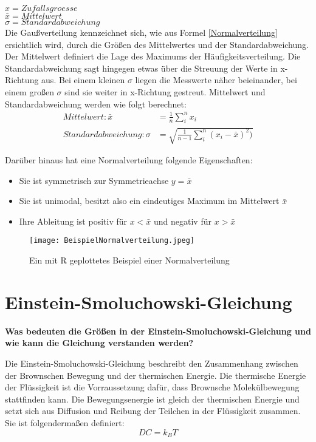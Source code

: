 \documentclass[a4paper, 12pt]{article}
\begin{document}
\noindent $x = Zufallsgroesse$\\
\noindent $\bar{x} = Mittelwert$\\
\noindent $\sigma = Standardabweichung$\\

Die Gaußverteilung kennzeichnet sich, wie aus Formel \ref{Normalverteilung} ersichtlich wird, durch die Größen des Mittelwertes und der Standardabweichung. Der Mittelwert definiert die Lage des Maximums der Häufigkeitsverteilung. Die Standardabweichung sagt hingegen etwas über die Streuung der Werte in x-Richtung aus. Bei einem kleinen $\sigma$ liegen die Messwerte näher beieinander, bei einem großen $\sigma$ sind sie weiter in x-Richtung gestreut.  
Mittelwert und Standardabweichung werden wie folgt berechnet:
\begin{equation}
\begin{split}
Mittelwert: \bar{x} &= \frac{1}{n}\sum\limits_{i}^{n}x_i\\
Standardabweichung: \sigma &= \sqrt{\frac{1}{n-1}\sum\limits_{i}^{n}(x_i-\bar{x})^2)}
\end{split}
\end{equation}

Darüber hinaus hat eine Normalverteilung folgende Eigenschaften:
\begin{itemize}
\item{Sie ist symmetrisch zur Symmetrieachse $y=\bar{x}$}
\item{Sie ist unimodal, besitzt also ein eindeutiges Maximum im Mittelwert $\bar{x}$}
\item{Ihre Ableitung ist positiv für $x<\bar{x}$ und negativ für $x>\bar{x}$}
\end{itemize}

\begin{figure}[h]
\centering
\texttt{[image: BeispielNormalverteilung.jpeg]}
\caption{Ein mit R geplottetes Beispiel einer Normalverteilung}
\end{figure}

\section{Einstein-Smoluchowski-Gleichung}
\textbf{Was bedeuten die Größen in der Einstein-Smoluchowski-Gleichung und wie kann die
Gleichung verstanden werden?}

Die Einstein-Smoluchowski-Gleichung beschreibt den Zusammenhang zwischen der Brownschen Bewegung und der thermischen Energie. Die thermische Energie der Flüssigkeit ist die Vorraussetzung dafür, dass Brownsche Molekülbewegung stattfinden kann. Die Bewegungsenergie ist gleich der thermischen Energie und setzt sich aus Diffusion und Reibung der Teilchen in der Flüssigkeit zusammen. Sie ist folgendermaßen definiert:
\begin{equation}
DC=k_BT
\end{equation}
\end{document}
